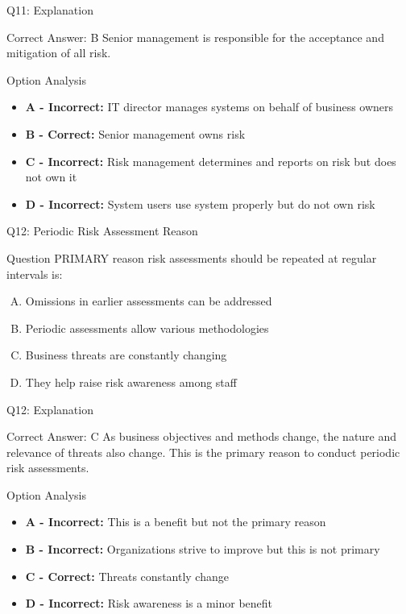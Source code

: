\documentclass{beamer}
\begin{document}
	\begin{frame}{Q11: Explanation}
		\begin{block}{Correct Answer: B}
			Senior management is responsible for the acceptance and mitigation of all risk.
		\end{block}
		\begin{block}{Option Analysis}
			\begin{itemize}
				\item \textbf{A - Incorrect:} IT director manages systems on behalf of business owners
				\item \textbf{B - Correct:} Senior management owns risk
				\item \textbf{C - Incorrect:} Risk management determines and reports on risk but does not own it
				\item \textbf{D - Incorrect:} System users use system properly but do not own risk
			\end{itemize}
		\end{block}
	\end{frame}
	
	\begin{frame}{Q12: Periodic Risk Assessment Reason}
		\begin{block}{Question}
			PRIMARY reason risk assessments should be repeated at regular intervals is:
		\end{block}
		\begin{enumerate}[(A)]
			\item Omissions in earlier assessments can be addressed
			\item Periodic assessments allow various methodologies
			\item Business threats are constantly changing
			\item They help raise risk awareness among staff
		\end{enumerate}
	\end{frame}
	
	\begin{frame}{Q12: Explanation}
		\begin{block}{Correct Answer: C}
			As business objectives and methods change, the nature and relevance of threats also change. This is the primary reason to conduct periodic risk assessments.
		\end{block}
		\begin{block}{Option Analysis}
			\begin{itemize}
				\item \textbf{A - Incorrect:} This is a benefit but not the primary reason
				\item \textbf{B - Incorrect:} Organizations strive to improve but this is not primary
				\item \textbf{C - Correct:} Threats constantly change
				\item \textbf{D - Incorrect:} Risk awareness is a minor benefit
			\end{itemize}
		\end{block}
	\end{frame}
	
\end{document}
